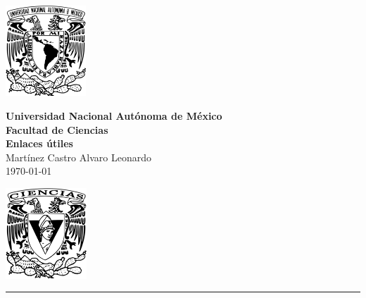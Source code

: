\documentclass[11pt,letterpaper]{article}
\begin{document}
\begin{center}
    \begin{minipage}{3cm}
    	\begin{center}
    		\includegraphics[height=3.4cm]{Logo_UNAM.png}
    	\end{center}
    \end{minipage}\hfill
    \begin{minipage}{10cm}
    	\begin{center}
    	\textbf{\large Universidad Nacional Autónoma de México}\\[0.1cm]
        \textbf{Facultad de Ciencias}\\[0.1cm]
        \textbf{Enlaces útiles}\\[0.1cm]
        Martínez Castro Alvaro Leonardo\\[0.1cm]
        \today
    	\end{center}
    \end{minipage}\hfill
    \begin{minipage}{3cm}
    	\begin{center}
    		\includegraphics[height=3.4cm]{Logo_FC.png}
    	\end{center}
    \end{minipage}
\end{center}

\rule{17cm}{0.1mm}

\end{document}
